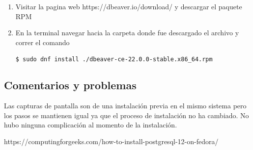 \documentclass{exam}
\begin{document}
\begin{enumerate}
	\item Visitar la pagina web https://dbeaver.io/download/ y descargar el paquete RPM
	
	\item En la terminal navegar hacia la carpeta donde fue descargado el archivo y correr el comando
	
	\verb|$ sudo dnf install ./dbeaver-ce-22.0.0-stable.x86_64.rpm|
\end{enumerate}


\subsection*{Comentarios y problemas}

Las capturas de pantalla son de una instalación previa en el mismo sistema pero los pasos se mantienen igual ya que el proceso de instalación no ha cambiado. No hubo ninguna complicación al momento de la instalación.

\begin{thebibliography}{1}
  	\bibitem {}https://computingforgeeks.com/how-to-install-postgresql-12-on-fedora/	
\end{thebibliography}
\end{document}
